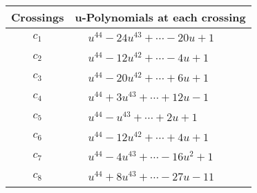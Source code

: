 \documentclass[1p]{elsarticle_modified}
\theoremstyle{definition}
\begin{document}
\begin{tabular}{m{50pt}|m{274pt}}
Crossings & \hspace{64pt}u-Polynomials at each crossing \\
\hline $$\begin{aligned}c_{1}\end{aligned}$$&$\begin{aligned}
&u^{44}-24 u^{43}+\cdots-20 u+1
\end{aligned}$\\
\hline $$\begin{aligned}c_{2}\end{aligned}$$&$\begin{aligned}
&u^{44}-12 u^{42}+\cdots-4 u+1
\end{aligned}$\\
\hline $$\begin{aligned}c_{3}\end{aligned}$$&$\begin{aligned}
&u^{44}-20 u^{42}+\cdots+6 u+1
\end{aligned}$\\
\hline $$\begin{aligned}c_{4}\end{aligned}$$&$\begin{aligned}
&u^{44}+3 u^{43}+\cdots+12 u-1
\end{aligned}$\\
\hline $$\begin{aligned}c_{5}\end{aligned}$$&$\begin{aligned}
&u^{44}- u^{43}+\cdots+2 u+1
\end{aligned}$\\
\hline $$\begin{aligned}c_{6}\end{aligned}$$&$\begin{aligned}
&u^{44}-12 u^{42}+\cdots+4 u+1
\end{aligned}$\\
\hline $$\begin{aligned}c_{7}\end{aligned}$$&$\begin{aligned}
&u^{44}-4 u^{43}+\cdots-16 u^2+1
\end{aligned}$\\
\hline $$\begin{aligned}c_{8}\end{aligned}$$&$\begin{aligned}
&u^{44}+8 u^{43}+\cdots-27 u-11
\end{aligned}$\\

\end{tabular}
\end{document}
